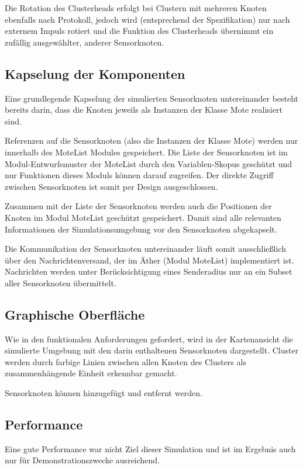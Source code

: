 Die Rotation des Clusterheads erfolgt bei Clustern mit mehreren Knoten
ebenfalls nach Protokoll, jedoch wird (entsprechend der Spezifikation)
nur nach externem Impuls rotiert und die Funktion des Clusterheads
übernimmt ein zufällig ausgewählter, anderer Sensorknoten.

\subsection{Kapselung der Komponenten}

Eine grundlegende Kapselung der simulierten Sensorknoten untereinander
besteht bereits darin, dass die Knoten jeweils als Instanzen der Klasse
Mote realisiert sind.

Referenzen auf die Sensorknoten (also die Instanzen der Klasse Mote)
werden nur innerhalb des MoteList Modules gespeichert. Die Liste der
Sensorknoten ist im Modul-Entwurfsmuster der MoteList durch den
Variablen-Skopus geschützt und nur Funktionen dieses Moduls können
darauf zugreifen. Der direkte Zugriff zwischen Sensorknoten ist somit
per Design ausgeschlossen.

Zusammen mit der Liste der Sensorknoten werden auch die Positionen der
Knoten im Modul MoteList geschützt gespeichert. Damit sind alle
relevanten Informationen der Simulationsumgebung vor den Sensorknoten
abgekapselt.

Die Kommunikation der Sensorknoten untereinander läuft somit
ausschließlich über den Nachrichtenversand, der im Äther (Modul
MoteList) implementiert ist. Nachrichten werden unter Berücksichtigung
eines Senderadius nur an ein Subset aller Sensorknoten übermittelt.

\subsection{Graphische Oberfläche}

Wie in den funktionalen Anforderungen gefordert, wird in der
Kartenansicht die simulierte Umgebung mit den darin enthaltenen
Sensorknoten dargestellt. Cluster werden durch farbige Linien zwischen
allen Knoten des Clusters als zusammenhängende Einheit erkennbar
gemacht.

Sensorknoten können hinzugefügt und entfernt werden.

\subsection{Performance}

Eine gute Performance war nicht Ziel dieser Simulation und ist im
Ergebnis auch nur für Demonstrationszwecke ausreichend.

